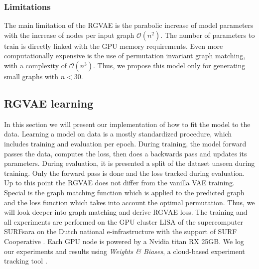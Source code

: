 \subsubsection{Limitations}

The main limitation of the RGVAE is the parabolic increase of model parameters with the increase of nodes per input graph $\mathcal{O}(n^2)$. The number of parameters to train is directly linked with the GPU memory requirements. Even more computationally expensive is the use of permutation invariant graph matching, with a complexity of $\mathcal{O}(n^3)$. Thus, we propose this model only for generating small graphs with $n<30$.






\subsection{RGVAE learning}

In this section we will present our implementation of how to fit the model to the data. Learning a model on data is a mostly standardized procedure, which includes training and evaluation per epoch. During training, the model forward passes the data, computes the loss, then does a backwards pass and updates its parameters. During evaluation, it is presented a split of the dataset unseen during training. Only the forward pass is done and the loss tracked during evaluation. Up to this point the RGVAE does not differ from the vanilla VAE training. Special is the graph matching function which is applied to the predicted graph and the loss function which takes into account the optimal permutation. Thus, we will look deeper into graph matching and derive RGVAE loss.
The training and all experiments are performed on the GPU cluster LISA of the supercomputer SURFsara on the Dutch national e-infrastructure with the support of SURF Cooperative \cite{fengvaleriu}. Each GPU node is powered by a Nvidia titan RX 25GB. We log our experiments and results using \textit{Weights & Biases}, a cloud-based experiment tracking tool \cite{wandb}.



